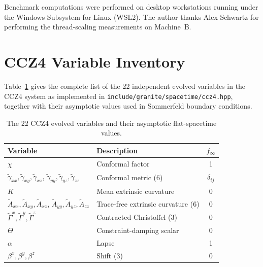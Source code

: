 \documentclass[aps,prd,twocolumn,superscriptaddress,nofootinbib,showpacs,
               longbibliography]{revtex4-2}
\newcommand{\code}[1]{\texttt{#1}}
\begin{document}
\begin{acknowledgments}
Benchmark computations were performed on desktop workstations running under
the Windows Subsystem for Linux (WSL2).
The author thanks Alex Schwartz for performing the thread-scaling
measurements on Machine~B.
\end{acknowledgments}

\appendix
\section{CCZ4 Variable Inventory}
\label{app:ccz4_vars}

Table~\ref{tab:ccz4_vars} gives the complete list of the 22 independent
evolved variables in the CCZ4 system as implemented in
\code{include/granite/spacetime/ccz4.hpp}, together with their asymptotic
values used in Sommerfeld boundary conditions.

\begin{table}[h]
\caption{The 22 CCZ4 evolved variables and their asymptotic flat-spacetime values.}
\label{tab:ccz4_vars}
\begin{ruledtabular}
\begin{tabular}{llc}
  Variable & Description & $f_\infty$ \\ \hline
  $\chi$ & Conformal factor & 1 \\
  $\tilde\gamma_{xx}, \tilde\gamma_{xy}, \tilde\gamma_{xz}$,
  $\tilde\gamma_{yy}, \tilde\gamma_{yz}, \tilde\gamma_{zz}$
    & Conformal metric (6) & $\delta_{ij}$ \\
  $K$ & Mean extrinsic curvature & 0 \\
  $\tilde A_{xx}, \tilde A_{xy}, \tilde A_{xz}$,
  $\tilde A_{yy}, \tilde A_{yz}, \tilde A_{zz}$
    & Trace-free extrinsic curvature (6) & 0 \\
  $\tilde\Gamma^x, \tilde\Gamma^y, \tilde\Gamma^z$
    & Contracted Christoffel (3) & 0 \\
  $\Theta$ & Constraint-damping scalar & 0 \\
  $\alpha$ & Lapse & 1 \\
  $\beta^x, \beta^y, \beta^z$ & Shift (3) & 0 \\
\end{tabular}
\end{ruledtabular}
\end{table}
\end{document}
